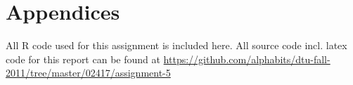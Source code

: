 \def\assignmenttitle{Estimating the Trajectory of a Satellite}
\def\assignmentnumber{5}
\def\assignmentdate{02-12-2011}
\def\githuburl{\small\url{https://github.com/alphabits/dtu-fall-2011/tree/master/02417/assignment-5}}
\def\githuburlfoot{\footnotesize\url{https://github.com/alphabits/dtu-fall-2011/tree/master/02417/assignment-5}}





\maketitle


\FloatBarrier

\pagebreak

\renewcommand\thesection{\Alph{section}}
\section{Appendices}

All R code used for this assignment is included here. All source code incl.
latex code for this report can be found at \githuburl

%

\pagebreak




